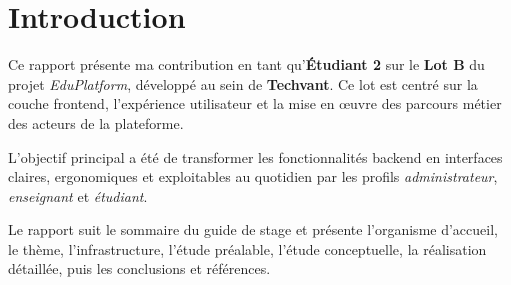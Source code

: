 \chapter*{Introduction}

Ce rapport présente ma contribution en tant qu'\textbf{Étudiant 2} sur le \textbf{Lot B} du projet \textit{EduPlatform}, développé au sein de \textbf{Techvant}. Ce lot est centré sur la couche frontend, l'expérience utilisateur et la mise en œuvre des parcours métier des acteurs de la plateforme.

L'objectif principal a été de transformer les fonctionnalités backend en interfaces claires, ergonomiques et exploitables au quotidien par les profils \textit{administrateur}, \textit{enseignant} et \textit{étudiant}.

Le rapport suit le sommaire du guide de stage et présente l'organisme d'accueil, le thème, l'infrastructure, l'étude préalable, l'étude conceptuelle, la réalisation détaillée, puis les conclusions et références.
